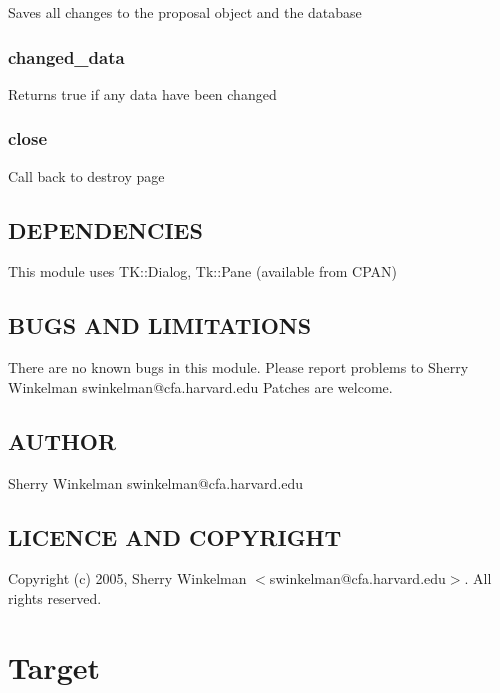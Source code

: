 \documentclass{article}
\begin{document}
Saves all changes to the proposal object and the database

\subsubsection*{changed\_data\label{Resurrect_changed_data}}


Returns true if any data have been changed

\subsubsection*{close\label{Resurrect_close}}


Call back to destroy page

\subsection*{DEPENDENCIES\label{Resurrect_DEPENDENCIES}}


This module uses TK::Dialog, Tk::Pane (available from CPAN)

\subsection*{BUGS AND LIMITATIONS\label{Resurrect_BUGS_AND_LIMITATIONS}}


There are no known bugs in this module.
Please report problems to Sherry Winkelman swinkelman@cfa.harvard.edu
Patches are welcome.

\subsection*{AUTHOR\label{Resurrect_AUTHOR}}


Sherry Winkelman swinkelman@cfa.harvard.edu

\subsection*{LICENCE AND COPYRIGHT\label{Resurrect_LICENCE_AND_COPYRIGHT}}


Copyright (c) 2005, Sherry Winkelman $<$swinkelman@cfa.harvard.edu$>$. All rights 
reserved.

\clearpage
\section{Target\label{Target}}
\end{document}

